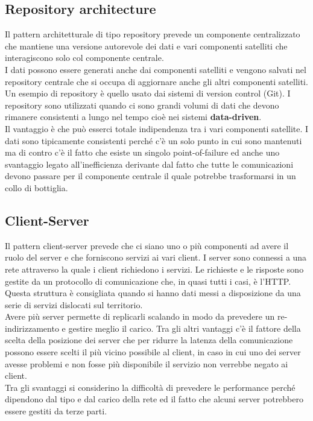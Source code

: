 \subsection{Repository architecture}
Il pattern architetturale di tipo repository prevede un componente centralizzato che mantiene una versione autorevole dei dati e vari componenti satelliti che interagiscono solo col componente centrale.\\
I dati possono essere generati anche dai componenti satelliti e vengono salvati nel repository centrale che si occupa di aggiornare anche gli altri componenti satelliti.
Un esempio di repository è quello usato dai sistemi di version control (Git).
I repository sono utilizzati quando ci sono grandi volumi di dati che devono rimanere consistenti a lungo nel tempo cioè nei sistemi \textbf{data-driven}.\\
Il vantaggio è che può esserci totale indipendenza tra i vari componenti satellite. 
I dati sono tipicamente consistenti perché c'è un solo punto in cui sono mantenuti ma di contro c'è il fatto che esiste un singolo point-of-failure ed anche uno svantaggio legato all'inefficienza derivante dal fatto che tutte le comunicazioni devono passare per il componente centrale il quale potrebbe trasformarsi in un collo di bottiglia.

\subsection{Client-Server}
Il pattern client-server prevede che ci siano uno o più componenti ad avere il ruolo del server e che forniscono servizi ai vari client.
I server sono connessi a una rete attraverso la quale i client richiedono i servizi.
Le richieste e le risposte sono gestite da un protocollo di comunicazione che, in quasi tutti i casi, è l'\acrfull{HTTP}.\\
Questa struttura è consigliata quando si hanno dati messi a disposizione da una serie di servizi dislocati sul territorio.\\
Avere più server permette di replicarli scalando in modo da prevedere un re-indirizzamento e gestire meglio il carico.
Tra gli altri vantaggi c'è il fattore della scelta della posizione dei server che per ridurre la latenza della comunicazione possono essere scelti il più vicino possibile al client, in caso in cui uno dei server avesse problemi e non fosse più disponibile il servizio non verrebbe negato ai client.\\
Tra gli svantaggi si considerino la difficoltà di prevedere le performance perché dipendono dal tipo e dal carico della rete ed il fatto che alcuni server potrebbero essere gestiti da terze parti.

